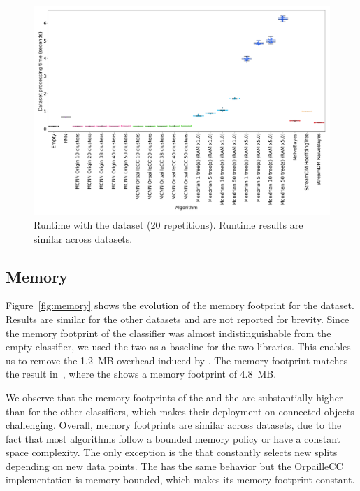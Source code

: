 \begin{figure}
	\includegraphics[width=\linewidth]{figures/results/banos_6_runtime.png}
	\caption{Runtime with the \banosdataset dataset (20 repetitions). Runtime
		results are similar across datasets.}
	\label{fig:runtime}
\end{figure}

\subsection{Memory}
\label{sec:result-memory}
Figure~\ref{fig:memory} shows the evolution of the memory footprint for the
\banosdataset dataset. Results are similar for the other datasets and are
not reported for brevity. Since the  memory footprint of the \naivebayes
classifier was almost indistinguishable from the empty classifier, we used
the two \naivebayes as a baseline for the two libraries. This enables us to
remove the 1.2~MB overhead induced by \streamdmcpp. The \streamdmcpp memory
footprint matches the result in~\cite{StreamDM-CPP}, where the
\hoeffdingtree shows a memory footprint of 4.8~MB.

We observe that the memory footprints of the \mondrianforest and the
\hoeffdingtree are substantially higher than for the other classifiers, which makes 
their deployment on connected objects challenging.
Overall, memory footprints are similar across datasets, due to the
fact that most algorithms follow a bounded memory policy or have a constant
space complexity.  The only exception is the \hoeffdingtree that constantly
selects new splits depending on new data points. The \mondrianforest has the
same behavior but the OrpailleCC implementation is memory-bounded, which
makes its memory footprint constant.

